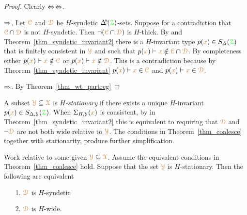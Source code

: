 \begin{proof}
  Clearly $\Leftrightarrow$$\Leftrightarrow$.

  $\Rightarrow$.
  Let ${\color{brown}\EuScript C}$ and ${\color{brown}\EuScript D}$ be $H$-syndetic $\BDelta({\grZ})$-sets.
  Suppose for a contradiction that ${\color{brown}\EuScript C}\cap{\color{brown}\EuScript D}$ is not $H$-syndetic.
  Then $\neg({\color{brown}\EuScript C}\cap{\color{brown}\EuScript D})$ is $H$-thick.
  By  and Theorem~\ref{thm_syndetic_invariant2} there is a $H$-invariant type $p({\color{brown} x})\in S_\Delta({\color{green}\EuScript Z})$ that is finitely consistent in ${\color{brown}\EuScript Y}$ and such that $p({\color{brown} x})\vdash{\color{brown}x}\notin{\color{brown}\EuScript C}\cap{\color{brown}\EuScript D}$.
  By completeness either $p({\color{brown} x})\vdash{\color{brown}x}\notin{\color{brown}\EuScript C}$ or $p({\color{brown} x})\vdash{\color{brown}x}\notin{\color{brown}\EuScript D}$.
  This is a contradiction because by Theorem~\ref{thm_syndetic_invariant} $p({\color{brown} x})\vdash{\color{brown}x}\in{\color{brown}\EuScript C}$ and $p({\color{brown} x})\vdash{\color{brown}x}\in{\color{brown}\EuScript D}$.


  $\Rightarrow$. By Theorem~\ref{thm_wt_partreg}
\end{proof}


A subset ${\color{brown}\EuScript Y}\subseteq{\color{brown}\EuScript X}$ is \emph{$H$-stationary\/} if there exists a unique $H$-invariant $p({\color{brown} x})\in S_{\Delta,\EuScript Y}({\color{green}\EuScript Z})$.
When $\Sigma_{H,\EuScript Y}({\color{brown} x})$ is consistent, by  in Theorem~\ref{thm_syndetic_invariant2} this is equivalent to requiring that ${\color{brown}\EuScript D}$ and $\neg{\color{brown}\EuScript D}$ are not both wide relative to ${\color{brown}\EuScript Y}$.
The conditions in Theorem~\ref{thm_coalesce} together with stationarity, produce further simplification.

\begin{fact}\label{fact_starionarity_thick_syndetic}
  Work relative to some given ${\color{brown}\EuScript Y}\subseteq{\color{brown}\EuScript X}$.
  Assume the equivalent conditions in Theorem~\ref{thm_coalesce} hold.
  Suppose that the set ${\color{brown}\EuScript Y}$ is $H$-stationary.
  Then the following are equivalent
  \begin{itemize}
    \item [1.] ${\color{brown}\EuScript D}$ is $H$-syndetic
    \item [2.] ${\color{brown}\EuScript D}$ is $H$-wide.
  \end{itemize}\smallskip
\end{fact}

